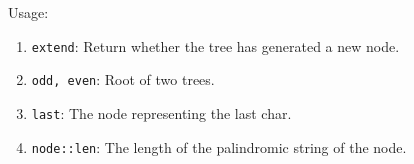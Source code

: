 Usage:
\begin{enumerate}
\item \texttt{extend}: Return whether the tree has generated a new node.
\item \texttt{odd, even}: Root of two trees.
\item \texttt{last}: The node representing the last char.
\item \texttt{node::len}: The length of the palindromic string of the node.
\end{enumerate}


